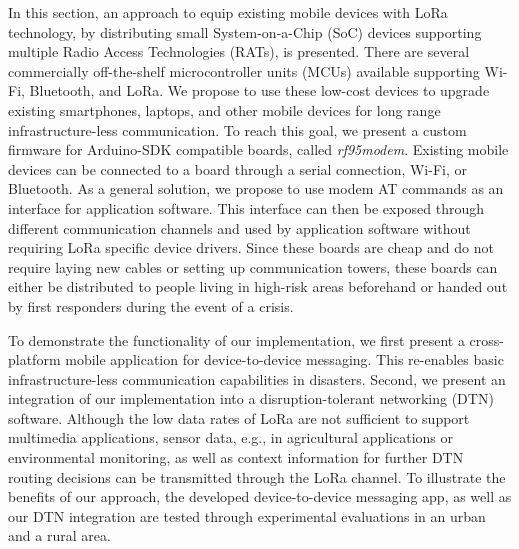 In this section, an approach to equip existing mobile devices with LoRa technology, by distributing small System-on-a-Chip (SoC) devices supporting multiple Radio Access Technologies (RATs), is presented. 
There are several commercially off-the-shelf microcontroller units (MCUs) available supporting Wi-Fi, Bluetooth, and LoRa.
We propose to use these low-cost devices to upgrade existing smartphones, laptops, and other mobile devices for long range infrastructure-less communication.
To reach this goal, we present a custom firmware for Arduino-SDK compatible boards, called \textit{rf95modem}.
Existing mobile devices can be connected to a board through a serial connection, Wi-Fi, or Bluetooth. 
As a general solution, we propose to use modem AT commands as an interface for application software. 
This interface can then be exposed through different communication channels and used by application software without requiring LoRa specific device drivers. 
Since these boards are cheap and do not require laying new cables or setting up communication towers, these boards can either be distributed to people living in high-risk areas beforehand or handed out by first responders during the event of a crisis.

To demonstrate the functionality of our implementation, we first present a cross-platform mobile application for device-to-device messaging. This re-enables basic infrastructure-less communication capabilities in disasters.
Second, we present an integration of our implementation into a disruption-tolerant networking (DTN) software.
Although the low data rates of LoRa are not sufficient to support multimedia applications, sensor data, e.g., in agricultural applications or environmental monitoring, as well as context information for further DTN routing decisions can be transmitted through the LoRa channel.
To illustrate the benefits of our approach,  the developed device-to-device messaging app, as well as our DTN integration are tested through experimental evaluations in an urban and a rural area. 

